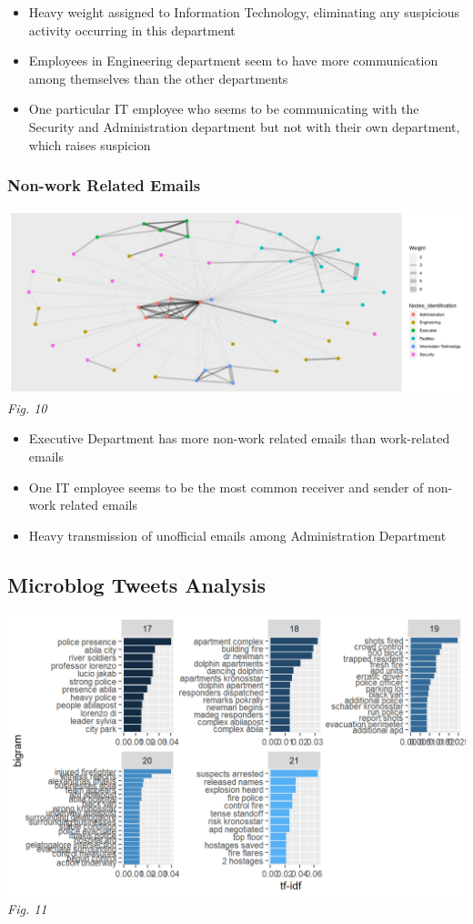 \documentclass{acm_proc_article-sp}
\providecommand{\tightlist}{%
  \setlength{\itemsep}{0pt}\setlength{\parskip}{0pt}}
\begin{document}
\begin{itemize}
\tightlist
\item
  Heavy weight assigned to Information Technology, eliminating any
  suspicious activity occurring in this department
\item
  Employees in Engineering department seem to have more communication
  among themselves than the other departments
\item
  One particular IT employee who seems to be communicating with the
  Security and Administration department but not with their own
  department, which raises suspicion
\end{itemize}

\hypertarget{non-work-related-emails}{%
\subsubsection{Non-work Related Emails}\label{non-work-related-emails}}

\includegraphics{img/image15.png} \emph{Fig. 10}

\begin{itemize}
\tightlist
\item
  Executive Department has more non-work related emails than
  work-related emails
\item
  One IT employee seems to be the most common receiver and sender of
  non-work related emails
\item
  Heavy transmission of unofficial emails among Administration
  Department
\end{itemize}

\hypertarget{microblog-tweets-analysis}{%
\subsection{Microblog Tweets Analysis}\label{microblog-tweets-analysis}}

\includegraphics{img/image08.png} \emph{Fig. 11}
\end{document}
